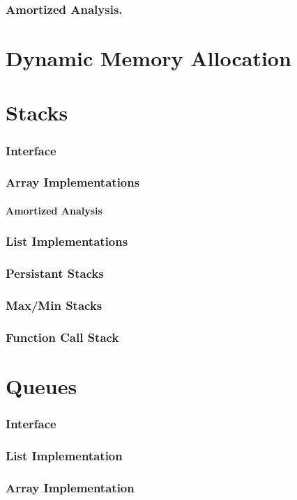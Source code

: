\documentclass[12pt, letterpaper]{book}
\begin{document}
	\subsection{Amortized Analysis.}

\chapter{Dynamic Memory Allocation}

\chapter{Stacks}
	\subsection{Interface}
	\subsection{Array Implementations}
		\subsubsection{Amortized Analysis}
	\subsection{List Implementations}
	\subsection{Persistant Stacks}
	\subsection{Max/Min Stacks}
	\subsection{Function Call Stack}

\chapter{Queues}
	\subsection{Interface}
	\subsection{List Implementation}
	\subsection{Array Implementation}
\end{document}
